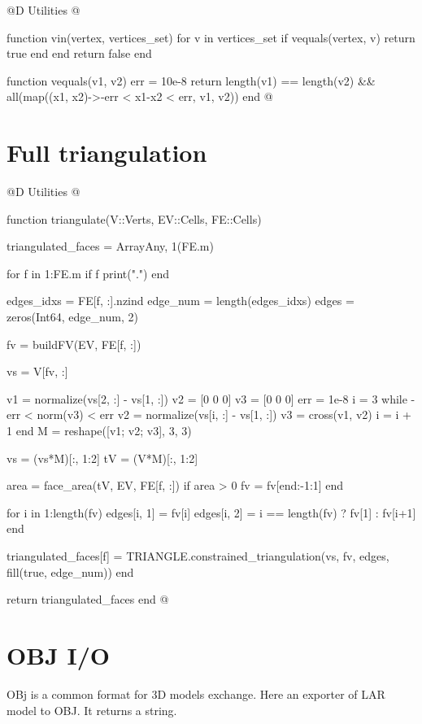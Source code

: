 @D Utilities
@{function vin(vertex, vertices_set)
    for v in vertices_set
        if vequals(vertex, v)
            return true
        end
    end
    return false
end

function vequals(v1, v2)
    err = 10e-8
    return length(v1) == length(v2) && all(map((x1, x2)->-err < x1-x2 < err, v1, v2))
end
@}

\section{Full triangulation}


@D Utilities
@{function triangulate(V::Verts, EV::Cells, FE::Cells)

    triangulated_faces = Array{Any, 1}(FE.m)

    for f in 1:FE.m
        if f %
            print(".")
        end
        
        edges_idxs = FE[f, :].nzind
        edge_num = length(edges_idxs)
        edges = zeros(Int64, edge_num, 2)

        
        fv = buildFV(EV, FE[f, :])

        vs = V[fv, :]

        v1 = normalize(vs[2, :] - vs[1, :])
        v2 = [0 0 0]
        v3 = [0 0 0]
        err = 1e-8
        i = 3
        while -err < norm(v3) < err
            v2 = normalize(vs[i, :] - vs[1, :])
            v3 = cross(v1, v2)
            i = i + 1
        end
        M = reshape([v1; v2; v3], 3, 3)

        vs = (vs*M)[:, 1:2]
        tV = (V*M)[:, 1:2]

        area = face_area(tV, EV, FE[f, :])
        if area > 0 
            fv = fv[end:-1:1]
        end
        
        for i in 1:length(fv)
            edges[i, 1] = fv[i]
            edges[i, 2] = i == length(fv) ? fv[1] : fv[i+1]
        end
        
        triangulated_faces[f] = TRIANGLE.constrained_triangulation(vs, fv, edges, fill(true, edge_num))
    end

    return triangulated_faces
end
@}


\section{OBJ I/O}

OBj is a common format for 3D models exchange. 
Here an exporter of LAR model to OBJ. It returns a string.

